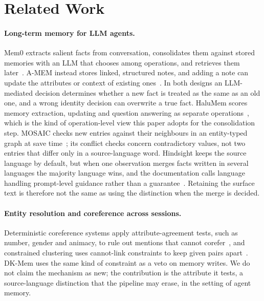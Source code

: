 \section{Related Work}
\label{sec:related}

\paragraph{Long-term memory for LLM agents.} Mem0 extracts salient facts from conversation, consolidates them against stored memories with
an LLM that chooses among operations, and retrieves them later~\citep{chhikara2025mem0}. A-MEM instead stores linked, structured notes, and
adding a note can update the attributes or context of existing ones~\citep{xu2025amem}. In both designs an LLM-mediated decision determines
whether a new fact is treated as the same as an old one, and a wrong identity decision can overwrite a true fact. HaluMem scores memory
extraction, updating and question answering as separate operations~\citep{chen2025halumem}, which is the kind of operation-level view this
paper adopts for the consolidation step. MOSAIC checks new entries against their neighbours in an entity-typed graph at save
time~\citep{zhao2026mosaic}; its conflict checks concern contradictory values, not two entries that differ only in a source-language word.
Hindsight keeps the source language by default, but when one observation merges facts written in several languages the majority language
wins, and the documentation calls language handling prompt-level guidance rather than a guarantee~\citep{vectorize2026hindsight}. Retaining
the surface text is therefore not the same as using the distinction when the merge is decided.

\paragraph{Entity resolution and coreference across sessions.} Deterministic coreference systems apply attribute-agreement tests, such as
number, gender and animacy, to rule out mentions that cannot corefer~\citep{raghunathan2010sieve,lee2013deterministic}, and constrained
clustering uses cannot-link constraints to keep given pairs apart~\citep{wagstaff2001constrained}. DK-Mem uses the same kind of constraint as
a veto on memory writes. We do not claim the mechanism as new; the contribution is the attribute it tests, a source-language distinction that
the pipeline may erase, in the setting of agent memory.


